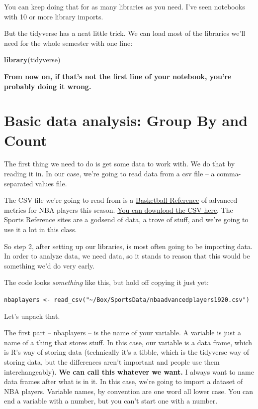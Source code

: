 \documentclass[
]{book}
\newenvironment{Shaded}{\begin{snugshade}}{\end{snugshade}}
\newcommand{\KeywordTok}[1]{\textcolor[rgb]{0.13,0.29,0.53}{\textbf{#1}}}
\newcommand{\NormalTok}[1]{#1}
\begin{document}
You can keep doing that for as many libraries as you need. I've seen notebooks with 10 or more library imports.

But the tidyverse has a neat little trick. We can load most of the libraries we'll need for the whole semester with one line:

\begin{Shaded}
\begin{Highlighting}[]
\KeywordTok{library}\NormalTok{(tidyverse)}
\end{Highlighting}
\end{Shaded}

\textbf{From now on, if that's not the first line of your notebook, you're probably doing it wrong.}

\hypertarget{basic-data-analysis-group-by-and-count}{%
\section{Basic data analysis: Group By and Count}\label{basic-data-analysis-group-by-and-count}}

The first thing we need to do is get some data to work with. We do that by reading it in. In our case, we're going to read data from a csv file -- a comma-separated values file.

The CSV file we're going to read from is a \href{https://www.basketball-reference.com/leagues/NBA_2020_advanced.html}{Basketball Reference} of advanced metrics for NBA players this season. \href{https://unl.box.com/s/5v1d70ab0xyaajkolynd54a1t4p38b3v}{You can download the CSV here}. The Sports Reference sites are a godsend of data, a trove of stuff, and we're going to use it a lot in this class.

So step 2, after setting up our libraries, is most often going to be importing data. In order to analyze data, we need data, so it stands to reason that this would be something we'd do very early.

The code looks \emph{something} like this, but hold off copying it just yet:

\texttt{nbaplayers\ \textless{}-\ read\_csv("\textasciitilde{}/Box/SportsData/nbaadvancedplayers1920.csv")}

Let's unpack that.

The first part -- nbaplayers -- is the name of your variable. A variable is just a name of a thing that stores stuff. In this case, our variable is a data frame, which is R's way of storing data (technically it's a tibble, which is the tidyverse way of storing data, but the differences aren't important and people use them interchangeably). \textbf{We can call this whatever we want.} I always want to name data frames after what is in it. In this case, we're going to import a dataset of NBA players. Variable names, by convention are one word all lower case. You can end a variable with a number, but you can't start one with a number.
\end{document}
